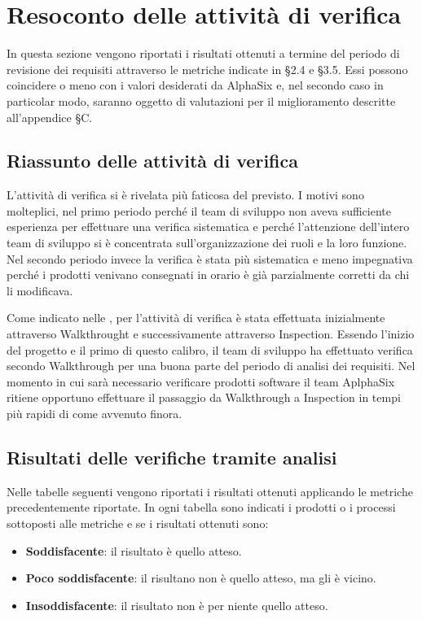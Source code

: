 \newpage
\section{Resoconto delle attività di verifica}
In questa sezione vengono riportati i risultati ottenuti a termine del periodo di revisione dei requisiti attraverso le metriche indicate in §2.4 e §3.5. Essi possono coincidere o meno con i valori desiderati da AlphaSix e, nel secondo caso in particolar modo, saranno oggetto di valutazioni per il miglioramento descritte all'appendice §C.

    \subsection{Riassunto delle attività di verifica}
    L'attività di verifica si è rivelata più faticosa del previsto. I motivi sono molteplici, nel primo periodo perché il team di sviluppo non aveva sufficiente esperienza per effettuare una verifica sistematica e perché l'attenzione dell'intero team di sviluppo si è concentrata sull'organizzazione dei ruoli e la loro funzione. Nel secondo periodo invece la verifica è stata più sistematica e meno impegnativa perché i prodotti venivano consegnati in orario è già parzialmente corretti da chi li modificava.
    
    Come indicato nelle \NdPv, per l'attività di verifica è stata effettuata inizialmente attraverso Walkthrought e successivamente attraverso Inspection. Essendo l'inizio del progetto e il primo di questo calibro, il team di sviluppo ha effettuato verifica secondo Walkthrough per una buona parte del periodo di analisi dei requisiti. Nel momento in cui sarà necessario verificare prodotti software il team AplphaSix ritiene opportuno effettuare il passaggio da Walkthrough a Inspection in tempi più rapidi di come avvenuto finora.
    
    \subsection{Risultati delle verifiche tramite analisi}
    Nelle tabelle seguenti vengono riportati i risultati ottenuti applicando le metriche precedentemente riportate. In ogni tabella sono indicati i prodotti o i processi sottoposti alle metriche e se i risultati ottenuti sono:
    
    \begin{itemize}
    	\item \textbf{Soddisfacente}: il risultato è quello atteso.
    	\item \textbf{Poco soddisfacente}: il risultano non è quello atteso, ma gli è vicino.
    	\item \textbf{Insoddisfacente}: il risultato non è per niente quello atteso.
    \end{itemize} 

